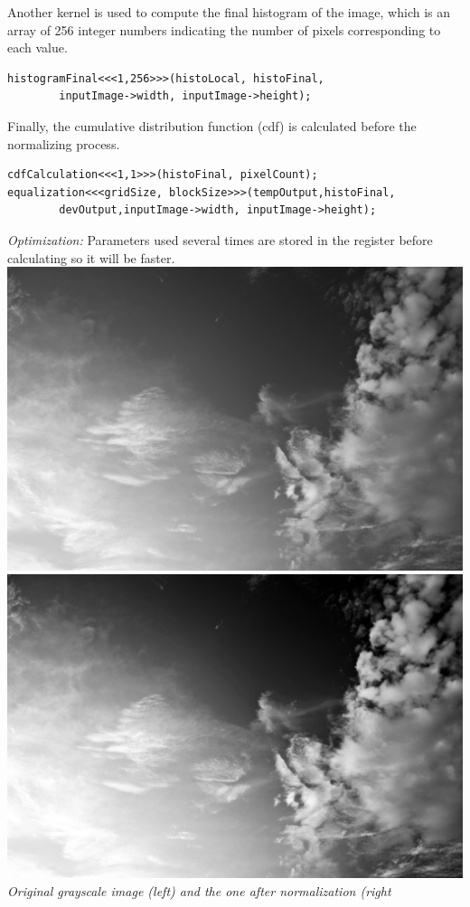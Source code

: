 \documentclass{article}
\begin{document}
Another kernel is used to compute the final histogram of the image, which is an array of 256 integer numbers indicating the number of pixels corresponding to each value. 
\begin{lstlisting}       
histogramFinal<<<1,256>>>(histoLocal, histoFinal, 
        inputImage->width, inputImage->height);
\end{lstlisting}
Finally, the cumulative distribution function (cdf) is calculated before the normalizing process.
\begin{lstlisting}         
cdfCalculation<<<1,1>>>(histoFinal, pixelCount);
equalization<<<gridSize, blockSize>>>(tempOutput,histoFinal,
        devOutput,inputImage->width, inputImage->height);
\end{lstlisting}

\textit{Optimization:} Parameters used several times are stored in the register before calculating so it will be faster. \\

\includegraphics[scale=0.045]{skyGray.jpg}
\includegraphics[scale=0.045]{labwork9-gpu-out.jpg}\\
\textit{Original grayscale image (left) and the one after normalization (right}
\end{document}
